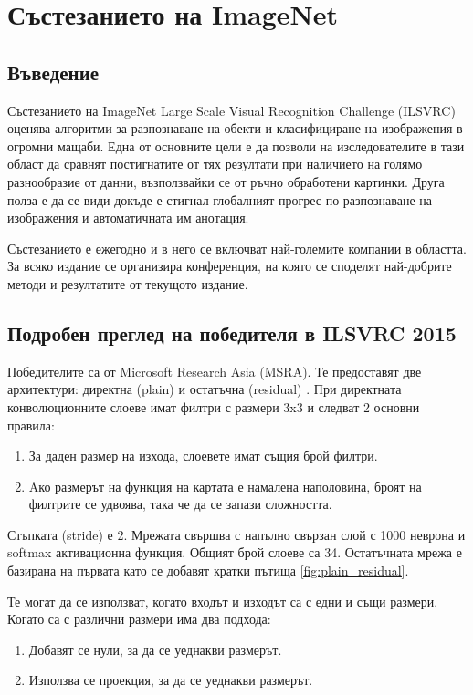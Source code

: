 \section{Състезанието на ImageNet}

\subsection{Въведение}

Състезанието на ImageNet Large Scale Visual Recognition Challenge (ILSVRC) \cite{ILSVRC15} оценява алгоритми за разпознаване на обекти и класифициране на изображения в огромни мащаби. Една от основните цели е да позволи на изследователите в тази област да сравнят постигнатите от тях резултати при наличието на голямо разнообразие от данни, възползвайки се от ръчно обработени картинки. Друга полза е да се види докъде е стигнал глобалният прогрес по разпознаване на изображения и автоматичната им анотация.

Състезанието е ежегодно и в него се включват най-големите компании в областта. За всяко издание се организира конференция, на която се споделят най-добрите методи и резултатите от текущото издание.

\subsection{Подробен преглед на победителя в ILSVRC 2015}
Победителите са от Microsoft Research Asia (MSRA). Те предоставят две архитектури: директна (plain) и остатъчна (residual) \cite{He2015}. При директната конволюционните слоеве имат филтри с размери 3x3 и следват 2 основни правила:
\begin{enumerate}
\item За даден размер на изхода, слоевете имат същия брой филтри.
\item Aко размерът на функция на картата е намалена наполовина, броят на филтрите се удвоява, така че да се запази сложността.
\end{enumerate}
Стъпката (stride) е 2. Мрежата свършва с напълно свързан слой с 1000 неврона и softmax активационна функция. Общият брой слоеве са 34.
Остатъчната мрежа е базирана на първата като се добавят кратки пътища \ref{fig:plain_residual}.

Те могат да се използват, когато входът и изходът са с едни и същи размери. Когато са с различни размери има два подхода:
\begin{enumerate}
\item Добавят се нули, за да се уеднакви размерът.
\item Използва се проекция, за да се уеднакви размерът.
\end{enumerate}


